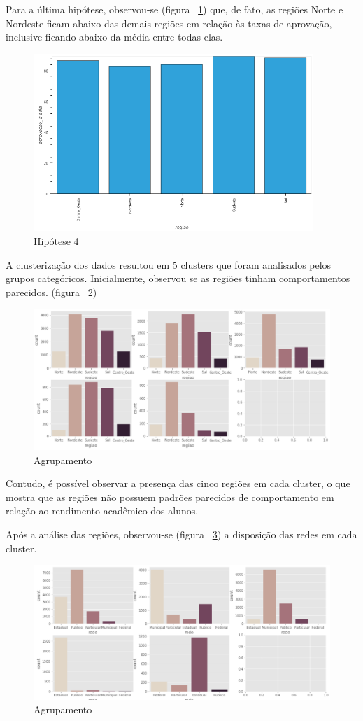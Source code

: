 \documentclass[review]{elsarticle}
\begin{document}
Para a última hipótese, observou-se (figura ~\ref{fig:h4}) que, de fato, as regiões Norte e Nordeste ficam abaixo das demais regiões em relação às taxas de aprovação, inclusive ficando abaixo da média entre todas elas.\par
\begin{figure}[h!]
\includegraphics[width=300pt]{h4_graph.png}
\caption{Hipótese 4}
\label{fig:h4}
\centering
\end{figure}
A clusterização dos dados resultou em 5 clusters que foram analisados pelos grupos categóricos. Inicialmente, observou se as regiões tinham comportamentos parecidos. (figura ~\ref{fig:c1})\par
\begin{figure}[h!]
\includegraphics[width=345pt]{cluster_1.png}
\caption{Agrupamento}
\label{fig:c1}
\centering
\end{figure}
Contudo, é possível observar a presença das cinco regiões em cada cluster, o que mostra que as regiões não possuem padrões parecidos de comportamento em relação ao rendimento acadêmico dos alunos.\par
Após a análise das regiões, observou-se (figura ~\ref{fig:c2}) a disposição das redes em cada cluster.\par
\begin{figure}[h!]
\includegraphics[width=345pt]{cluster_2.png}
\caption{Agrupamento}
\label{fig:c2}
\centering
\end{figure}
\end{document}
